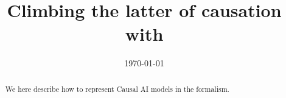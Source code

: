 \documentclass[aps,onecolumn,nofootinbib,pra]{article}
\begin{document}
    \title{Climbing the latter of causation with \tnreason{}}

    \maketitle
    \date{\today}

    \begin{abstract}
        We here describe how to represent Causal AI models in the \tnreason{} formalism.
    \end{abstract}


    
    
    
    




    
    
\end{document}
